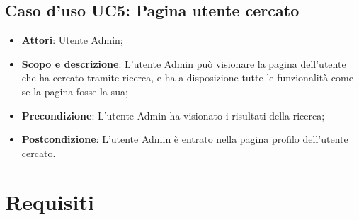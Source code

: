 \documentclass[12pt,a4paper,titlepage]{article}
\begin{document}
	\subsection{Caso d'uso UC5: Pagina utente cercato}
	\label{UC5}
	\begin{itemize}
		\item \textbf{Attori}: Utente Admin;
		\item \textbf{Scopo e descrizione}: L'utente Admin può visionare la pagina dell'utente che ha cercato tramite ricerca, e ha a disposizione tutte le funzionalità come se la pagina fosse la sua;
		\item \textbf{Precondizione}: L'utente Admin ha visionato i risultati della ricerca;
		\item \textbf{Postcondizione}: L'utente Admin è entrato nella pagina profilo dell'utente cercato.
	\end{itemize}
	\newpage
	\section{Requisiti}
\end{document}
